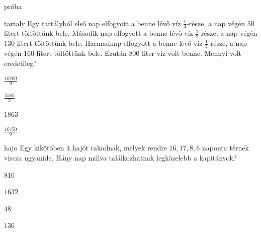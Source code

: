 \documentclass[12pt]{article}
\begin{document}
\begin{quiz}{próba}

\begin{multi}{tartaly}
Egy tartályból első nap elfogyott a benne lévő víz $\frac{1}{4}$-része, a nap végén $50$ litert töltöttünk bele.
Második nap elfogyott a benne lévő víz $\frac{1}{2}$-része, a nap végén $130$ litert töltöttünk bele.
Harmadnap elfogyott a benne lévő víz $\frac{1}{4}$-része, a nap végén $160$ litert töltöttünk bele.
Ezután $800$ liter víz volt benne. Mennyi volt eredetileg?

\item* $ \frac{16760}{9}  $
\item  $ \frac{5585}{3} $
\item  $ 1863 $
\item  $ \frac{16750}{9} $
\end{multi}
\begin{multi}{hajo}
Egy kikötőben $4$ hajót rakodnak, melyek rendre $16,17,8,6$ naponta térnek 
vissza ugyanide. Hány nap múlva találkozhatnak legközelebb a kapitányok?
\item* $ 816  $
\item  $ 1632 $
\item  $ 48 $
\item  $ 136 $
\end{multi}
\end{quiz}
\end{document}
